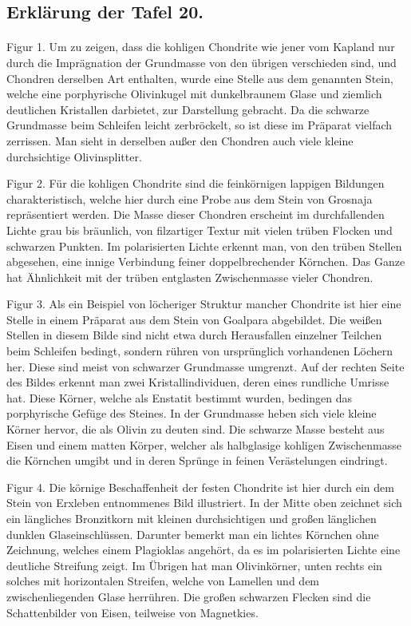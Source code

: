\documentclass[a4paper, 11pt, oneside, polutonikogreek, german]{article}
\begin{document}
\subsection{Erklärung der Tafel 20.}
\paragraph{}
Figur 1. Um zu zeigen, dass die kohligen Chondrite wie jener vom Kapland nur durch die Imprägnation der Grundmasse von den übrigen verschieden sind, und Chondren derselben Art enthalten, wurde eine Stelle aus dem genannten Stein, welche eine porphyrische Olivinkugel mit dunkelbraunem Glase und ziemlich deutlichen Kristallen darbietet, zur Darstellung gebracht. Da die schwarze Grundmasse beim Schleifen leicht zerbröckelt, so ist diese im Präparat vielfach zerrissen. Man sieht in derselben außer den Chondren auch viele kleine durchsichtige Olivinsplitter.

Figur 2. Für die kohligen Chondrite sind die feinkörnigen lappigen Bildungen charakteristisch, welche hier durch eine Probe aus dem Stein von Grosnaja repräsentiert werden. Die Masse dieser Chondren erscheint im durchfallenden Lichte grau bis bräunlich, von filzartiger Textur mit vielen trüben Flocken und schwarzen Punkten. Im polarisierten Lichte erkennt man, von den trüben Stellen abgesehen, eine innige Verbindung feiner doppelbrechender Körnchen. Das Ganze hat Ähnlichkeit mit der trüben entglasten Zwischenmasse vieler Chondren.

Figur 3. Als ein Beispiel von löcheriger Struktur mancher Chondrite ist hier eine Stelle in einem Präparat aus dem Stein von Goalpara abgebildet. Die weißen Stellen in diesem Bilde sind nicht etwa durch Herausfallen einzelner Teilchen beim Schleifen bedingt, sondern rühren von ursprünglich vorhandenen Löchern her. Diese sind meist von schwarzer Grundmasse umgrenzt. Auf der rechten Seite des Bildes erkennt man zwei Kristallindividuen, deren eines rundliche Umrisse hat. Diese Körner, welche als Enstatit bestimmt wurden, bedingen das porphyrische Gefüge des Steines. In der Grundmasse heben sich viele kleine Körner hervor, die als Olivin zu deuten sind. Die schwarze Masse besteht aus Eisen und einem matten Körper, welcher als halbglasige kohligen Zwischenmasse die Körnchen umgibt und in deren Sprünge in feinen Verästelungen eindringt.

Figur 4. Die körnige Beschaffenheit der festen Chondrite ist hier durch ein dem Stein von Erxleben entnommenes Bild illustriert. In der Mitte oben zeichnet sich ein längliches Bronzitkorn mit kleinen durchsichtigen und großen länglichen dunklen Glaseinschlüssen. Darunter bemerkt man ein lichtes Körnchen ohne Zeichnung, welches einem Plagioklas angehört, da es im polarisierten Lichte eine deutliche Streifung zeigt. Im Übrigen hat man Olivinkörner, unten rechts ein solches mit horizontalen Streifen, welche von Lamellen und dem zwischenliegenden Glase herrühren. Die großen schwarzen Flecken sind die Schattenbilder von Eisen, teilweise von Magnetkies.
\clearpage
\end{document}
